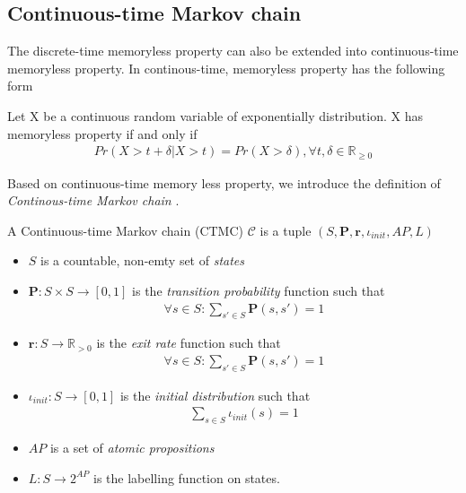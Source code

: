\subsection{Continuous-time Markov chain}
The discrete-time memoryless property can also be extended into continuous-time memoryless property.
In continous-time, memoryless property has the following form
\begin{definition}
      Let X be a continuous random variable of exponentially distribution. X has memoryless property
      if and only if
      \begin{align*}
            Pr(X > t + \delta | X > t) = Pr(X > \delta), \forall t,\delta \in \mathbb{R}_{\geq 0}
      \end{align*}
\end{definition}
Based on continuous-time memory less property, we introduce the definition of \textit{Continous-time
      Markov chain} \cite{katoen2013model}.
\begin{definition}
      A Continuous-time Markov chain (CTMC) $\mathcal{C}$ is a tuple $(S,\mathbf{P}, \mathbf{r}, \iota_{init}, AP, L)$
      \begin{itemize}
            \item $S$ is a countable, non-emty set of \textit{states}
            \item $\mathbf{P}:S\times S \rightarrow [0,1]$ is the \textit{transition probability}
                  function such that
                  \begin{align*}
                        \forall s \in S : \sum_{s'\in S}\mathbf{P}(s, s') = 1
                  \end{align*}
            \item $\mathbf{r}:S \rightarrow \mathbb{R}_{>0}$ is the \textit{exit rate} function
                  such that
                  \begin{align*}
                        \forall s \in S : \sum_{s'\in S}\mathbf{P}(s, s') = 1
                  \end{align*}
            \item $\iota_{init}: S \rightarrow [0,1]$ is the \textit{initial distribution} such that
                  \begin{align*}
                        \sum_{s\in S}\iota_{init}(s) = 1
                  \end{align*}
            \item $AP$ is a set of \textit{atomic propositions}
            \item $L: S \rightarrow 2^{AP}$ is the labelling function on states.
      \end{itemize}
\end{definition}

